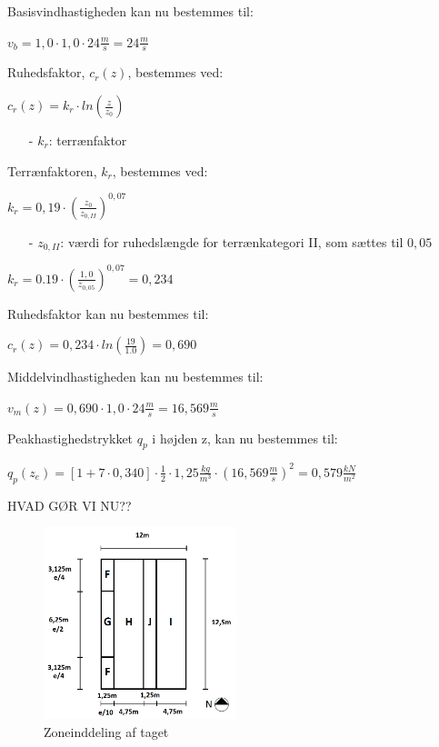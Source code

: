 Basisvindhastigheden kan nu bestemmes til:
\begin{center}
$v_b=1,\!0\cdot 1,\!0\cdot 24 \frac{m}{s}=24 \frac{m}{s}$
\end{center}
Ruhedsfaktor, $c_r(z)$, bestemmes ved:
\begin{center}
$c_r(z)=k_r\cdot ln(\frac{z}{z_0})$
\end{center}
\begin{itemize}
	\item[-] $k_r$: terrænfaktor
\end{itemize}
Terrænfaktoren, $k_r$, bestemmes ved:
\begin{center}
$k_r=0,\!19\cdot (\frac{z_0}{z_{0,II}})^{0,\!07}$
\end{center}
\begin{itemize}
	\item[-] $z_{0,II}$: værdi for ruhedslængde for terrænkategori II, som sættes til $0,\!05$ \citep[ kapitel 4.3.2]{EU91}
\end{itemize}
\begin{center}
$k_r=0.19\cdot (\frac{1,\!0}{z_{0,\!05}})^{0,\!07}=0,\!234$
\end{center}
Ruhedsfaktor kan nu bestemmes til:
\begin{center}
$c_r(z)=0,\!234\cdot ln(\frac{19}{1.0})=0,\!690$
\end{center}
Middelvindhastigheden kan nu bestemmes til:
\begin{center}
$v_m(z)=0,\!690\cdot 1,\!0\cdot 24 \frac{m}{s}=16,\!569 \frac{m}{s}$
\end{center}
Peakhastighedstrykket $q_p$ i højden z, kan nu bestemmes til:
\begin{center}
$q_p(z_e)=[1+7\cdot 0,\!340]\cdot \frac{1}{2}\cdot 1,\!25 \frac{kg}{m^3}\cdot (16,\!569 \frac{m}{s})^2=0,\!579 \frac{kN}{m^2}$
\end{center}

HVAD GØR VI NU??

\begin{figure}[htbp]
	\centering
	\includegraphics[width=0.5\textwidth]{billeder/opdeling.png}
	\caption{Zoneinddeling af taget}
	\label{fig:tag}
\end{figure}

